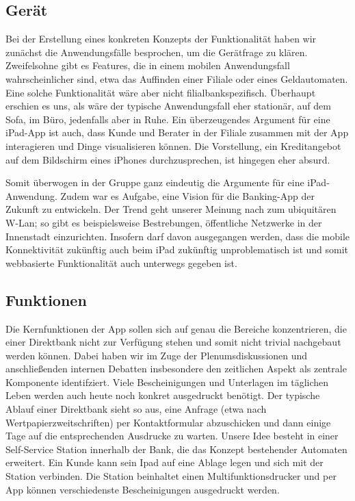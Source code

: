 \subsection{Gerät}
    Bei der Erstellung eines konkreten Konzepts der Funktionalität haben wir zunächst die Anwendungsfälle besprochen, um die Gerätfrage zu klären. Zweifelsohne gibt es Features, die in einem mobilen Anwendungsfall wahrscheinlicher sind, etwa das Auffinden einer Filiale oder eines Geldautomaten. Eine solche Funktionalität wäre aber nicht filialbankspezifisch. Überhaupt erschien es uns, als wäre der typische Anwendungsfall eher stationär, auf dem Sofa, im Büro, jedenfalls aber in Ruhe. Ein überzeugendes Argument für eine iPad-App ist auch, dass Kunde und Berater in der Filiale zusammen mit der App interagieren und Dinge visualisieren können. Die Vorstellung, ein Kreditangebot auf dem Bildschirm eines iPhones durchzusprechen, ist hingegen eher absurd. 
    
    
    Somit überwogen in der Gruppe ganz eindeutig die Argumente für eine iPad-Anwendung. Zudem war es Aufgabe, eine Vision für die Banking-App der Zukunft zu entwickeln. Der Trend geht unserer Meinung nach zum ubiquitären W-Lan; so gibt es beispielsweise Bestrebungen, öffentliche Netzwerke in der Innenstadt einzurichten. Insofern darf davon ausgegangen werden, dass die mobile Konnektivität zukünftig auch beim iPad zukünftig unproblematisch ist und somit webbasierte Funktionalität auch unterwegs gegeben ist.
    

\subsection{Funktionen}
    Die Kernfunktionen der App sollen sich auf genau die Bereiche konzentrieren, die einer Direktbank nicht zur Verfügung stehen und somit nicht trivial nachgebaut werden können. Dabei haben wir im Zuge der Plenumsdiskussionen und anschließenden internen Debatten insbesondere den zeitlichen Aspekt als zentrale Komponente identifziert. Viele Bescheinigungen und Unterlagen im täglichen Leben werden auch heute noch konkret ausgedruckt benötigt. Der typische Ablauf einer Direktbank sieht so aus, eine Anfrage (etwa nach Wertpapierzweitschriften) per Kontaktformular abzuschicken und dann einige Tage auf die entsprechenden Ausdrucke zu warten. Unsere Idee besteht in einer Self-Service Station innerhalb der Bank, die das Konzept bestehender Automaten erweitert. Ein Kunde kann sein Ipad auf eine Ablage legen und sich mit der Station verbinden. Die Station beinhaltet einen Multifunktionsdrucker und per App können verschiedenste Bescheinigungen ausgedruckt werden. 
    
